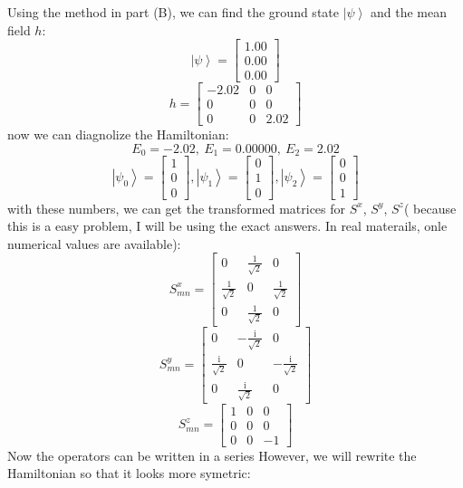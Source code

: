 \documentclass[letter]{article}
\newcommand{\ii}{\mathrm{i}}
\begin{document}
Using the method in part (B), we can find the ground state $\left|\psi\right>$ and the mean field $h$:
$$
\left|\psi\right>=\begin{bmatrix}
    1.00 \\
0.00 \\
0.00
    \end{bmatrix}
$$
$$
h=\begin{bmatrix}
    -2.02 & 0 & 0 \\
    0 &  0 & 0 \\
    0 &  0 & 2.02
    \end{bmatrix}
$$
now we can diagnolize the Hamiltonian:
$$E_{0}=-2.02,\ E_{1}=0.00000,\ E_{2}=2.02
$$
$$\left|\psi_0\right>=\begin{bmatrix}
    1 \\
0 \\
0
    \end{bmatrix},\left|\psi_1\right>=\begin{bmatrix}
       0 \\
    1 \\
    0
        \end{bmatrix},\left|\psi_2\right>=\begin{bmatrix}
            0 \\
            0 \\
            1
            \end{bmatrix}
$$
with these numbers, we can get the transformed matrices for $S^x$, $S^y$, $S^z$( because this is a easy problem, I will be using the exact answers. In real materails, onle numerical values are available):
$$S^x_{mn}=\begin{bmatrix}
    0& \frac{1}{\sqrt{2}} & 0\\
    \frac{1}{\sqrt{2}} &  0 & \frac{1}{\sqrt{2}}\\
0& \frac{1}{\sqrt{2}}&0
    \end{bmatrix}$$$$
S^y_{mn}=\begin{bmatrix}
    0& -\frac{\ii}{\sqrt{2}} & 0\\
    \frac{\ii}{\sqrt{2}} &  0 & -\frac{\ii}{\sqrt{2}}\\
0& \frac{\ii}{\sqrt{2}}&0
    \end{bmatrix}$$ $$
S^z_{mn}=\begin{bmatrix}
1 & 0 & 0 \\
0 &  0 & 0 \\
0 &  0 & -1
\end{bmatrix}
$$
Now the operators can be written in a series However, we will rewrite the Hamiltonian so that it looks more symetric: \\
\end{document}
